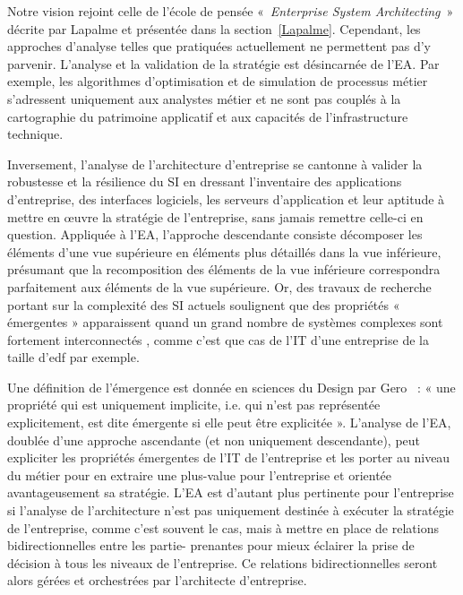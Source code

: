  Notre vision rejoint celle de l'école de pensée «~\textit{Enterprise System
Architecting}~» décrite par Lapalme \cite{lapalme2012three} et présentée dans la
section~\ref{Lapalme}. Cependant, les approches d'analyse telles que pratiquées
actuellement ne permettent pas d'y parvenir. L'analyse et la validation de la
stratégie est désincarnée de l'EA. Par exemple, les algorithmes d'optimisation
et de simulation de processus métier s'adressent uniquement aux analystes métier
et ne sont pas couplés à la cartographie du patrimoine applicatif et aux
capacités de l'infrastructure technique.

Inversement, l'analyse de l'architecture d'entreprise se cantonne à valider
la robustesse et la résilience du SI en dressant l'inventaire des applications
d'entreprise, des interfaces logiciels, les serveurs d'application et leur
aptitude à mettre en œuvre la stratégie de l'entreprise, sans jamais remettre
celle-ci en question. Appliquée à l'EA, l'approche descendante consiste
décomposer les éléments d'une vue supérieure en éléments plus détaillés dans la
vue inférieure, présumant que la recomposition des éléments de la vue
inférieure correspondra parfaitement aux éléments de la vue supérieure. Or, des
travaux de recherche portant sur la complexité des SI actuels soulignent que
des propriétés « émergentes » apparaissent quand un grand nombre de systèmes
complexes sont fortement interconnectés \cite{bullock2004complexity}, comme
c'est que cas de l'IT d'une entreprise de la taille d'\gls{edf} par exemple.

 Une définition de l'émergence est donnée en sciences du Design par Gero
\cite{gero1992creativity}~: « une propriété qui est uniquement implicite, i.e.
qui n'est pas représentée explicitement, est dite émergente si elle peut être
explicitée ». L'analyse de l'EA, doublée d'une approche ascendante (et non
uniquement descendante), peut expliciter les propriétés émergentes de l'IT de
l'entreprise et les porter au niveau du métier pour en extraire une plus-value
pour l'entreprise et orientée avantageusement sa stratégie. L'EA est d'autant
plus pertinente pour l'entreprise si l'analyse de l'architecture n'est pas
uniquement destinée à exécuter la stratégie de l'entreprise, comme c'est souvent
le cas, mais à mettre en place de relations bidirectionnelles entre les partie-
prenantes pour mieux éclairer la prise de décision à tous les niveaux de
l'entreprise. Ce relations bidirectionnelles seront alors gérées et orchestrées
par l'architecte d'entreprise.


